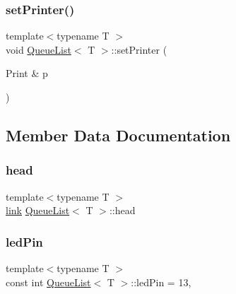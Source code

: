 \mbox{\label{class_queue_list_a2497b59c53aec471ec68f9d604e693ac}} 
\subsubsection{\texorpdfstring{set\+Printer()}{setPrinter()}}
{\footnotesize\ttfamily template$<$typename T $>$ \\
void \mbox{\hyperlink{class_queue_list}{Queue\+List}}$<$ T $>$\+::set\+Printer (\begin{DoxyParamCaption}\item[{Print \&}]{p }\end{DoxyParamCaption})}



\subsection{Member Data Documentation}
\mbox{\label{class_queue_list_ac7ae88c334c9a55d3e77c8b2aa181a72}} 
\subsubsection{\texorpdfstring{head}{head}}
{\footnotesize\ttfamily template$<$typename T $>$ \\
\mbox{\hyperlink{class_queue_list_a2dbbea18dafe3bc1585072a26cee8e68}{link}} \mbox{\hyperlink{class_queue_list}{Queue\+List}}$<$ T $>$\+::head\hspace{0.3cm}{\ttfamily [private]}}

\mbox{\label{class_queue_list_a8f3aa75e676514f61c31eb9f657f526a}} 
\subsubsection{\texorpdfstring{led\+Pin}{ledPin}}
{\footnotesize\ttfamily template$<$typename T $>$ \\
const int \mbox{\hyperlink{class_queue_list}{Queue\+List}}$<$ T $>$\+::led\+Pin = 13\hspace{0.3cm}{\ttfamily [static]}, {\ttfamily [private]}}

